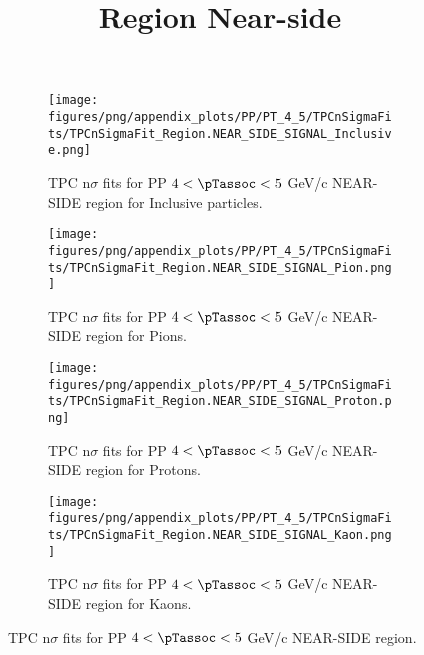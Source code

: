             \begin{figure}[H]
                \title{Region Near-side}
                \begin{subfigure}[b]{0.5\textwidth}
                    \centering
                    \texttt{[image: figures/png/appendix\_plots/PP/PT\_4\_5/TPCnSigmaFits/TPCnSigmaFit\_Region.NEAR\_SIDE\_SIGNAL\_Inclusive.png]}
                    \caption{TPC n$\sigma$ fits for PP $4 < \pTassoc < 5$ GeV/c NEAR-SIDE region for Inclusive particles.}
                    \label{fig:appendix_PP_$4 < \pTassoc < 5$ GeV/c_NEAR_SIDE_SIGNAL_Inclusive}
                \end{subfigure}
                \begin{subfigure}[b]{0.5\textwidth}
                    \centering
                    \texttt{[image: figures/png/appendix\_plots/PP/PT\_4\_5/TPCnSigmaFits/TPCnSigmaFit\_Region.NEAR\_SIDE\_SIGNAL\_Pion.png]}
                    \caption{TPC n$\sigma$ fits for PP $4 < \pTassoc < 5$ GeV/c NEAR-SIDE region for Pions.}
                    \label{fig:appendix_PP_$4 < \pTassoc < 5$ GeV/c_NEAR_SIDE_SIGNAL_Pion}
                \end{subfigure}
                \begin{subfigure}[b]{0.5\textwidth}
                    \centering
                    \texttt{[image: figures/png/appendix\_plots/PP/PT\_4\_5/TPCnSigmaFits/TPCnSigmaFit\_Region.NEAR\_SIDE\_SIGNAL\_Proton.png]}
                    \caption{TPC n$\sigma$ fits for PP $4 < \pTassoc < 5$ GeV/c NEAR-SIDE region for Protons.}
                    \label{fig:appendix_PP_$4 < \pTassoc < 5$ GeV/c_NEAR_SIDE_SIGNAL_Proton}
                \end{subfigure}
                \begin{subfigure}[b]{0.5\textwidth}
                    \centering
                    \texttt{[image: figures/png/appendix\_plots/PP/PT\_4\_5/TPCnSigmaFits/TPCnSigmaFit\_Region.NEAR\_SIDE\_SIGNAL\_Kaon.png]}
                    \caption{TPC n$\sigma$ fits for PP $4 < \pTassoc < 5$ GeV/c NEAR-SIDE region for Kaons.}
                    \label{fig:appendix_PP_$4 < \pTassoc < 5$ GeV/c_NEAR_SIDE_SIGNAL_Kaon}
                \end{subfigure}
                \caption{TPC n$\sigma$ fits for PP $4 < \pTassoc < 5$ GeV/c NEAR-SIDE region.}
                \label{fig:appendix_PP_$4 < \pTassoc < 5$ GeV/c_NEAR_SIDE_SIGNAL}
            \end{figure}
